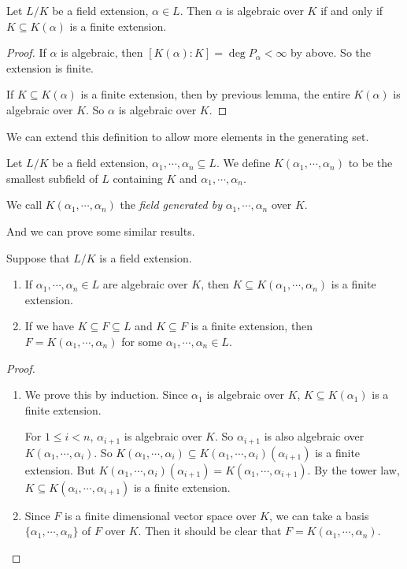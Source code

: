 \documentclass[a4paper]{article}
\begin{document}
\begin{cor}
  Let $L/K$ be a field extension, $\alpha \in L$. Then $\alpha$ is algebraic over $K$ if and only if $K \subseteq K(\alpha)$ is a finite extension.
\end{cor}

\begin{proof}
  If $\alpha$ is algebraic, then $[K(\alpha): K] = \deg P_\alpha < \infty$ by above. So the extension is finite.

  If $K\subseteq K(\alpha)$ is a finite extension, then by previous lemma, the entire $K(\alpha)$ is algebraic over $K$. So $\alpha$ is algebraic over $K$.
\end{proof}

We can extend this definition to allow more elements in the generating set.
\begin{defi}
  Let $L/K$ be a field extension, $\alpha_1, \cdots, \alpha_n\subseteq L$. We define $K(\alpha_1, \cdots, \alpha_n)$ to be the smallest subfield of $L$ containing $K$ and $\alpha_1, \cdots, \alpha_n$.

  We call $K(\alpha_1, \cdots, \alpha_n)$ the \emph{field generated by} $\alpha_1, \cdots, \alpha_n$ over $K$.
\end{defi}

And we can prove some similar results.

\begin{thm}
  Suppose that $L/K$ is a field extension.
  \begin{enumerate}
    \item If $\alpha_1, \cdots, \alpha_n \in L$ are algebraic over $K$, then $K\subseteq K(\alpha_1, \cdots, \alpha_n)$ is a finite extension.
    \item If we have $K\subseteq F\subseteq L$ and $K\subseteq F$ is a finite extension, then $F = K(\alpha_1, \cdots, \alpha_n)$ for some $\alpha_1,\cdots, \alpha_n \in L$.
  \end{enumerate}
\end{thm}

\begin{proof}\leavevmode
  \begin{enumerate}
    \item We prove this by induction. Since $\alpha_1$ is algebraic over $K$, $K\subseteq K(\alpha_1)$ is a finite extension.

      For $1 \leq i < n$, $\alpha_{i + 1}$ is algebraic over $K$. So $\alpha_{i + 1}$ is also algebraic over $K(\alpha_1, \cdots, \alpha_i)$. So $K(\alpha_1, \cdots, \alpha_i)\subseteq K(\alpha_1, \cdots, \alpha_i)(\alpha_{i + 1})$ is a finite extension. But $K(\alpha_1, \cdots, \alpha_i)(\alpha_{i + 1}) = K(\alpha_1, \cdots, \alpha_{i + 1})$. By the tower law, $K \subseteq K(\alpha_i, \cdots, \alpha_{i + 1})$ is a finite extension.

    \item Since $F$ is a finite dimensional vector space over $K$, we can take a basis $\{\alpha_1, \cdots, \alpha_n\}$ of $F$ over $K$. Then it should be clear that $F = K(\alpha_1, \cdots, \alpha_n)$.
  \end{enumerate}
\end{proof}
\end{document}
